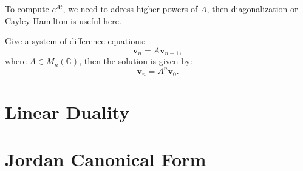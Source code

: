 \documentclass[12pt]{article}
\begin{document}
\begin{remark}
    To compute $e^{At}$, we need to adress higher powers of $A$, 
    then diagonalization or Cayley-Hamilton is useful here.
\end{remark}

\begin{exercise}
    Give a system of difference equations:
    \[ \mathbf{v}_n=A \mathbf{v}_{n-1},\]
    where $A\in M_n(\mathbb{C})$, then the solution is given by:
    \[\mathbf{v}_n=A^n \mathbf{v}_{0}.\]
\end{exercise}


\newpage
\section{Linear Duality}


\newpage
\section{Jordan Canonical Form}

\end{document}
